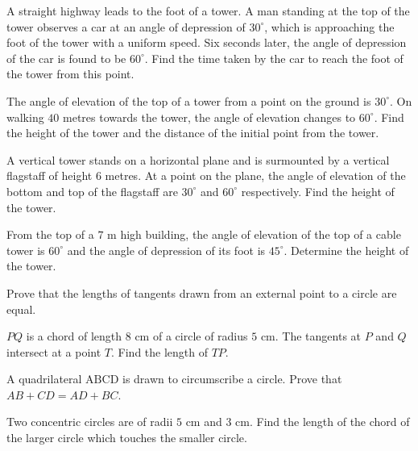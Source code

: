 \documentclass[12pt,a4paper]{exam}
\begin{document}
\begin{questions}
\question[5] A straight highway leads to the foot of a tower. A man standing at the top of the tower observes a car at an angle of depression of $30^\circ$, which is approaching the foot of the tower with a uniform speed. Six seconds later, the angle of depression of the car is found to be $60^\circ$. Find the time taken by the car to reach the foot of the tower from this point.
\vspace{0.15cm}

\question[5] The angle of elevation of the top of a tower from a point on the ground is $30^\circ$. On walking $40$ metres towards the tower, the angle of elevation changes to $60^\circ$. Find the height of the tower and the distance of the initial point from the tower.
\vspace{0.15cm}

\question[5] A vertical tower stands on a horizontal plane and is surmounted by a vertical flagstaff of height $6$ metres. At a point on the plane, the angle of elevation of the bottom and top of the flagstaff are $30^\circ$ and $60^\circ$ respectively. Find the height of the tower.
\vspace{0.15cm}

\question[5] From the top of a $7$ m high building, the angle of elevation of the top of a cable tower is $60^\circ$ and the angle of depression of its foot is $45^\circ$. Determine the height of the tower.
\vspace{0.15cm}

\question[5] Prove that the lengths of tangents drawn from an external point to a circle are equal.
\vspace{0.15cm}

\question[5] $PQ$ is a chord of length $8\text{ cm}$ of a circle of radius $5\text{ cm}$. The tangents at $P$ and $Q$ intersect at a point $T$. Find the length of $TP$.
\vspace{0.15cm}

\question[5] A quadrilateral $\text{ABCD}$ is drawn to circumscribe a circle. Prove that $AB + CD = AD + BC$.
\vspace{0.15cm}

\question[5] Two concentric circles are of radii $5\text{ cm}$ and $3\text{ cm}$. Find the length of the chord of the larger circle which touches the smaller circle.
\vspace{0.15cm}

\end{questions}
\bigskip
\end{document}
